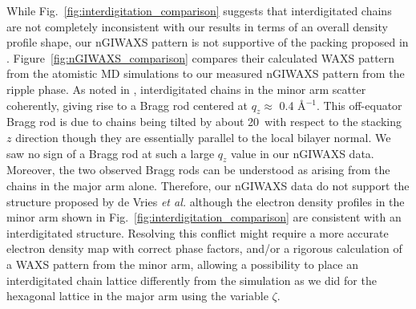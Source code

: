 While Fig.~\ref{fig:interdigitation_comparison}
suggests that interdigitated chains are not completely inconsistent with 
our results in terms of an overall density profile shape, 
our nGIWAXS pattern is not supportive of the packing proposed in 
\cite{ref:deVries05}. Figure~\ref{fig:nGIWAXS_comparison} compares
their calculated WAXS pattern from the atomistic MD simulations
to our measured nGIWAXS pattern from the ripple phase. As noted in
\cite{ref:deVries05}, interdigitated chains in the minor arm scatter
coherently, giving rise to a Bragg rod centered at $q_z \approx$ 0.4 \AA$^{-1}$.
This off-equator Bragg rod is due to chains being tilted by about 20\textdegree\
with respect to the stacking $z$ direction though they
are essentially parallel to the local bilayer normal.
We saw no sign of a Bragg rod at such a large $q_z$ value in our nGIWAXS
data. 
Moreover, the two observed Bragg rods can be understood as arising from
the chains in the major arm alone. 
Therefore, our nGIWAXS data do not support the structure proposed by
de Vries \textit{et al.} \cite{ref:deVries05} although
the electron density profiles in the minor arm shown in 
Fig.~\ref{fig:interdigitation_comparison} are consistent with
an interdigitated structure.
Resolving this conflict might require a more accurate electron density
map with correct phase factors, and/or a rigorous calculation of a WAXS pattern
from the minor arm, 
allowing a possibility to place an interdigitated chain lattice differently from
the simulation as we did for the hexagonal lattice in the major arm 
using the variable $\zeta$. 

